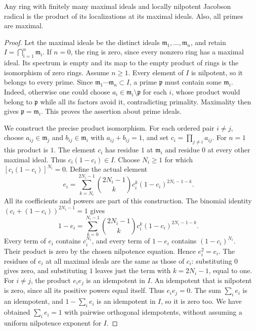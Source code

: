 \begin{lemma}
\label{lemma-product-local}
Any ring with finitely many maximal ideals and
locally nilpotent Jacobson radical is the product of its localizations
at its maximal ideals. Also, all primes are maximal.
\end{lemma}

\begin{proof}
Let the maximal ideals be the distinct ideals
$\mathfrak m_1,\ldots,\mathfrak m_n$, and retain
$I=\bigcap_{i=1}^n\mathfrak m_i$.
If $n=0$, the ring is zero, since every nonzero ring has a
maximal ideal. Its spectrum is empty and its map to the empty
product of rings is the isomorphism of zero rings. Assume $n\geq1$.
Every element of $I$ is nilpotent, so it belongs to every prime.
Since $\mathfrak m_1\cdots\mathfrak m_n\subset I$, a prime
$\mathfrak p$ must contain some $\mathfrak m_i$.
Indeed, otherwise one could choose $a_i\in\mathfrak m_i\setminus
\mathfrak p$ for each $i$, whose product would belong to
$\mathfrak p$ while all its factors avoid it, contradicting
primality. Maximality then gives $\mathfrak p=\mathfrak m_i$.
This proves the assertion about prime ideals.

We construct the precise product isomorphism. For each ordered
pair $i\neq j$, choose $a_{ij}\in\mathfrak m_j$ and
$b_{ij}\in\mathfrak m_i$ with $a_{ij}+b_{ij}=1$, and set
$c_i=\prod_{j\neq i}a_{ij}$. For $n=1$ this product is $1$.
The element $c_i$ has residue $1$ at $\mathfrak m_i$ and
residue $0$ at every other maximal ideal. Thus
$c_i(1-c_i)\in I$. Choose $N_i\geq1$ for which
$[c_i(1-c_i)]^{N_i}=0$. Define the actual element
$$
e_i=\sum_{k=N_i}^{2N_i-1}
\binom{2N_i-1}{k}c_i^k(1-c_i)^{2N_i-1-k}.
$$
All its coefficients and powers are part of this construction.
The binomial identity $(c_i+(1-c_i))^{2N_i-1}=1$ gives
$$
1-e_i=\sum_{k=0}^{N_i-1}
\binom{2N_i-1}{k}c_i^k(1-c_i)^{2N_i-1-k}.
$$
Every term of $e_i$ contains $c_i^{N_i}$, and every term of
$1-e_i$ contains $(1-c_i)^{N_i}$. Their product is zero by
the chosen nilpotence equation. Hence $e_i^2=e_i$.
The residues of $e_i$ at all maximal ideals are the same as
those of $c_i$: substituting $0$ gives zero, and substituting
$1$ leaves just the term with $k=2N_i-1$, equal to one.
For $i\neq j$, the product $e_ie_j$ is an idempotent in $I$.
An idempotent that is nilpotent is zero, since all its positive
powers equal itself. Thus $e_ie_j=0$.
The sum $\sum_i e_i$ is an idempotent, and
$1-\sum_i e_i$ is an idempotent in $I$, so it is zero too.
We have obtained $\sum_i e_i=1$ with pairwise orthogonal
idempotents, without assuming a uniform nilpotence exponent for $I$.


\end{proof}
